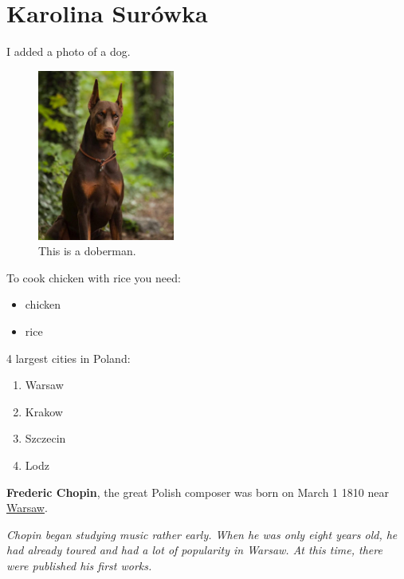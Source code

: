 
\section{Karolina Surówka}
\label{seq:karsur}
I added a photo of a dog.

\begin{figure}[htbp]
    \centering
    \includegraphics[width=0.4\textwidth]{Pictures/2_KSurowka.jpg}
    \caption{This is a doberman.}
 
\end{figure}

To cook chicken with rice you need:
\begin{itemize}
\renewcommand{\labelitemi}{$-$}
  \item chicken
  \item rice
  
\end{itemize}

\vspace{1.0 cm}


4 largest cities in Poland:  
\begin{enumerate}
  \item Warsaw
  \item Krakow
  \item Szczecin
  \item Lodz
\end{enumerate}


\vspace{1.0 cm}


\setlength{\parindent}{10ex}
 \textbf{Frederic Chopin}, the great Polish composer was born on March 1 1810 near \underline{Warsaw}.\par

\setlength{\parindent}{10ex}
 \textit{Chopin began studying music rather early. When he was only eight years old, he had already toured and had a lot of popularity in Warsaw. At this time, there were published his first works.}
 \par
\vspace{3.0 cm}







